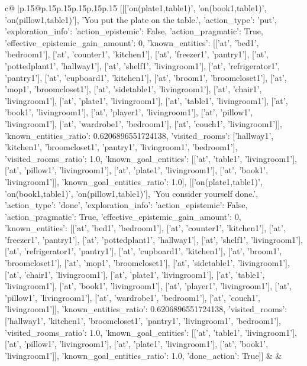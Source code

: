 \documentclass{article}
\begin{document}
{\begin{supertabular}{c@{$\;$}|p{.15\linewidth}@{}p{.15\linewidth}p{.15\linewidth}p{.15\linewidth}p{.15\linewidth}p{.15\linewidth}}
{{{	 [[['on(plate1,table1)', 'on(book1,table1)', 'on(pillow1,table1)'], 'You put the plate on the table.', {'action_type': 'put', 'exploration_info': {'action_epistemic': False, 'action_pragmatic': True, 'effective_epistemic_gain_amount': 0, 'known_entities': [['at', 'bed1', 'bedroom1'], ['at', 'counter1', 'kitchen1'], ['at', 'freezer1', 'pantry1'], ['at', 'pottedplant1', 'hallway1'], ['at', 'shelf1', 'livingroom1'], ['at', 'refrigerator1', 'pantry1'], ['at', 'cupboard1', 'kitchen1'], ['at', 'broom1', 'broomcloset1'], ['at', 'mop1', 'broomcloset1'], ['at', 'sidetable1', 'livingroom1'], ['at', 'chair1', 'livingroom1'], ['at', 'plate1', 'livingroom1'], ['at', 'table1', 'livingroom1'], ['at', 'book1', 'livingroom1'], ['at', 'player1', 'livingroom1'], ['at', 'pillow1', 'livingroom1'], ['at', 'wardrobe1', 'bedroom1'], ['at', 'couch1', 'livingroom1']], 'known_entities_ratio': 0.6206896551724138, 'visited_rooms': ['hallway1', 'kitchen1', 'broomcloset1', 'pantry1', 'livingroom1', 'bedroom1'], 'visited_rooms_ratio': 1.0, 'known_goal_entities': [['at', 'table1', 'livingroom1'], ['at', 'pillow1', 'livingroom1'], ['at', 'plate1', 'livingroom1'], ['at', 'book1', 'livingroom1']], 'known_goal_entities_ratio': 1.0}}], [['on(plate1,table1)', 'on(book1,table1)', 'on(pillow1,table1)'], 'You consider yourself done.', {'action_type': 'done', 'exploration_info': {'action_epistemic': False, 'action_pragmatic': True, 'effective_epistemic_gain_amount': 0, 'known_entities': [['at', 'bed1', 'bedroom1'], ['at', 'counter1', 'kitchen1'], ['at', 'freezer1', 'pantry1'], ['at', 'pottedplant1', 'hallway1'], ['at', 'shelf1', 'livingroom1'], ['at', 'refrigerator1', 'pantry1'], ['at', 'cupboard1', 'kitchen1'], ['at', 'broom1', 'broomcloset1'], ['at', 'mop1', 'broomcloset1'], ['at', 'sidetable1', 'livingroom1'], ['at', 'chair1', 'livingroom1'], ['at', 'plate1', 'livingroom1'], ['at', 'table1', 'livingroom1'], ['at', 'book1', 'livingroom1'], ['at', 'player1', 'livingroom1'], ['at', 'pillow1', 'livingroom1'], ['at', 'wardrobe1', 'bedroom1'], ['at', 'couch1', 'livingroom1']], 'known_entities_ratio': 0.6206896551724138, 'visited_rooms': ['hallway1', 'kitchen1', 'broomcloset1', 'pantry1', 'livingroom1', 'bedroom1'], 'visited_rooms_ratio': 1.0, 'known_goal_entities': [['at', 'table1', 'livingroom1'], ['at', 'pillow1', 'livingroom1'], ['at', 'plate1', 'livingroom1'], ['at', 'book1', 'livingroom1']], 'known_goal_entities_ratio': 1.0}, 'done_action': True}]] 
	  } 
	   } 
	   } 
	 & & \\ 
 

    \theutterance {}  


\end{supertabular}}
\end{document}
